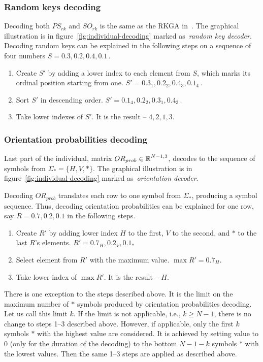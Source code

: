\subsubsection*{Random keys decoding}
Decoding both $PS_{rk}$ and $SO_{rk}$ is the same as the RKGA in~\cite{beanGeneticAlgorithmsRandom1994}.
The graphical illustration is in figure~\ref{fig:individual-decoding} marked as~\textit{random key decoder}.
Decoding random keys can be explained in the following steps on a sequence of four numbers $S = 0.3, 0.2, 0.4, 0.1$\,.

\begin{enumerate}
    \item Create $S'$ by adding a lower index to each element from $S$, which marks its ordinal position starting from one.
    $S' = 0.3_1, 0.2_2, 0.4_3, 0.1_4$\,.
    \item Sort $S'$ in descending order. $S' = 0.1_4, 0.2_2,  0.3_1, 0.4_3$\,.
    \item Take lower indexes of $S'$.
    It is the result – $4, 2, 1, 3$.
\end{enumerate}

\subsubsection*{Orientation probabilities decoding}

Last part of the individual, matrix $OR_{prob} \in \operatorname*{\mathbb{R}}^{N-1, 3}$, decodes to the sequence of symbols from $\Sigma_* = \{H, V, *\} $.
The graphical illustration is in figure~\ref{fig:individual-decoding} marked as~\textit{orientation decoder}.

Decoding $OR_{prob}$ translates each row to one symbol from $\Sigma_*$, producing a symbol sequence.
Thus, decoding orientation probabilities can be explained for one row, say $R = 0.7, 0.2, 0.1$
in the following steps.


\begin{enumerate}
    \item Create $R'$ by adding lower index $H$ to the first, $V$ to the second, and $*$ to the last $R$'s elements.
    $R' = 0.7_H, 0.2_V, 0.1_*$
    \item Select element from $R'$ with the maximum value. $\max R' = 0.7_H$.
    \item Take lower index of $\max R'$.
    It is the result – $H$.
\end{enumerate}

There is one exception to the steps described above.
It is the limit on the maximum number of $*$ symbols produced by orientation probabilities decoding.
Let us call this limit $k$.
If the limit is not applicable, i.e., $k \geq N-1$, there is no change to steps 1--3 described above.
However, if applicable, only the first $k$ symbols $*$ with the highest value are considered.
It is achieved by setting value to $0$ (only for the duration of the decoding) to the bottom $N-1-k$ symbols $*$ with the lowest values.
Then the same 1--3 steps are applied as described above.

